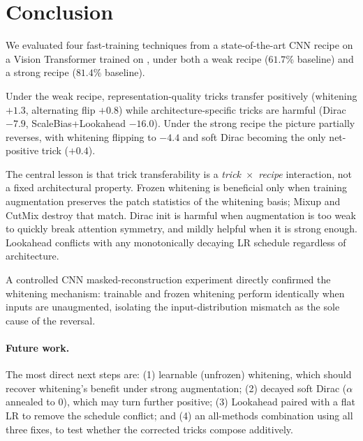 \section{Conclusion}
\label{sec:conclusion}

We evaluated four fast-training techniques from a state-of-the-art CNN recipe on a Vision Transformer trained on \cifar{}, under both a weak recipe ($61.7\%$ baseline) and a strong recipe ($81.4\%$ baseline).

Under the weak recipe, representation-quality tricks transfer positively (whitening $+1.3$\pp{}, alternating flip $+0.8$\pp{}) while architecture-specific tricks are harmful (Dirac $-7.9$\pp{}, ScaleBias+Lookahead $-16.0$\pp{}).
Under the strong recipe the picture partially reverses, with whitening flipping to $-4.4$\pp{} and soft Dirac becoming the only net-positive trick ($+0.4$\pp{}).

The central lesson is that trick transferability is a \emph{trick~$\times$~recipe} interaction, not a fixed architectural property.
Frozen whitening is beneficial only when training augmentation preserves the patch statistics of the whitening basis; Mixup and CutMix destroy that match.
Dirac init is harmful when augmentation is too weak to quickly break attention symmetry, and mildly helpful when it is strong enough.
Lookahead conflicts with any monotonically decaying LR schedule regardless of architecture.

A controlled CNN masked-reconstruction experiment directly confirmed the whitening mechanism: trainable and frozen whitening perform identically when inputs are unaugmented, isolating the input-distribution mismatch as the sole cause of the reversal.

\paragraph{Future work.}
The most direct next steps are: (1) learnable (unfrozen) whitening, which should recover whitening's benefit under strong augmentation; (2) decayed soft Dirac ($\alpha$ annealed to 0), which may turn further positive; (3) Lookahead paired with a flat LR to remove the schedule conflict; and (4) an all-methods combination using all three fixes, to test whether the corrected tricks compose additively.
